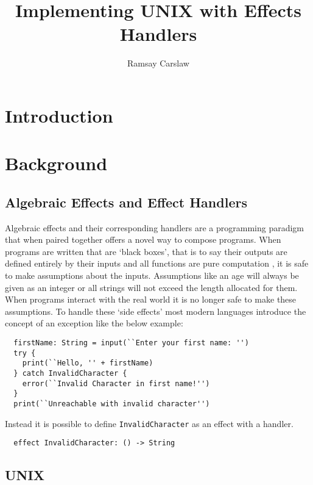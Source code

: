 \documentclass{report}
\title{Implementing UNIX with Effects Handlers}
\author{Ramsay Carslaw}
\begin{document}
\maketitle

\tableofcontents

\chapter{Introduction}

\chapter{Background}

\section{Algebraic Effects and Effect Handlers}

Algebraic effects and their corresponding handlers \cite{plotkin2009handlers}
\cite{pretnar2015introduction} are a programming paradigm that when paired
together offers a novel way to compose programs. When programs are written that
are `black boxes', that is to say their outputs are defined entirely by their
inputs and all functions are pure computation \cite{hughes1989functional}, it is
safe to make assumptions about the inputs. Assumptions like an age will always
be given as an integer or all strings will not exceed the length allocated for
them. When programs interact with the real world it is no longer safe to make
these assumptions. To handle these `side effects' most modern languages
introduce the concept of an exception like the below example:

\begin{lstlisting}
  firstName: String = input(``Enter your first name: '')
  try {
    print(``Hello, '' + firstName)
  } catch InvalidCharacter {
    error(``Invalid Character in first name!'')
  }
  print(``Unreachable with invalid character'')
\end{lstlisting}

Instead it is possible to define \texttt{InvalidCharacter} as an effect with a
handler.

\begin{lstlisting}
  effect InvalidCharacter: () -> String
\end{lstlisting}

\section{\textsc{UNIX}}
\end{document}
